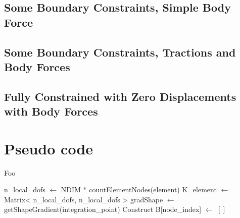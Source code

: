 \documentclass{article}
\begin{document}
\subsection{Some Boundary Constraints, Simple Body Force}

\subsection{Some Boundary Constraints, Tractions and Body Forces}

\subsection{Fully Constrained with Zero Displacements with Body Forces}



\section{Pseudo code}

\begin{algorithm}
\begin{algorithmic}

    \State Foo
\EndProcedure

\end{algorithmic}
\end{algorithm}

\begin{algorithm}
\begin{algorithmic}

    \State n\_local\_dofs $\gets$ NDIM $*$ countElementNodes(element)  
    \State K\_element $\gets$ Matrix< n\_local\_dofs, n\_local\_dofs >
        \State gradShape $\gets$ getShapeGradient(integration\_point)
        \Comment Construct
            \State B[node\_index] $\gets$ $ \left[  \right]$
        \EndFor
    \EndFor
\EndProcedure

\end{algorithmic}
\end{algorithm}



\end{document}
